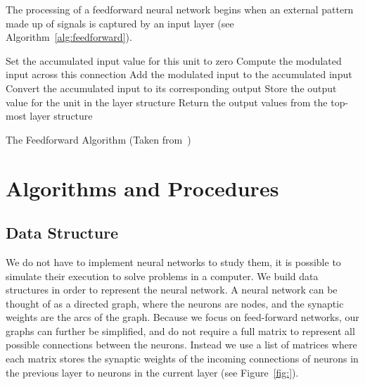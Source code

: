 \documentclass[11pt]{article}
\begin{document}
The processing of a feedforward neural network begins when an external pattern made up of signals is captured by an input layer (see
Algorithm~\ref{alg:feedforward}).

\begin{algorithm}%
\SetLine
{}
{
	{
		Set the accumulated input value for this unit to zero\;
			{
				Compute the modulated input across this connection\;
				Add the modulated input to the accumulated input\;
			}
		Convert the accumulated input to its corresponding output\;
		Store the output value for the unit in the layer structure\;
	}
	Return the output values from the top-most layer structure\;
}

\caption{The Feedforward Algorithm (Taken from~\cite{skapura})}
\label{alg:feedforward}
\end{algorithm}




\section{Algorithms and Procedures} %
\label{sec:algorithms_and_procedures}

\subsection{Data Structure} %
\label{sub:data_structure}

We do not have to implement neural networks to study them, it is possible to simulate their execution to solve problems in a computer.
We build data structures in order to represent the neural network. A neural network can be thought of as a directed graph, where the
neurons are nodes, and the synaptic weights are the arcs of the graph. Because we focus on feed-forward networks, our graphs can further
be simplified, and do not require a full matrix to represent all possible connections between the neurons. Instead we use a list of
matrices where each matrix stores the synaptic weights of the incoming connections of neurons in the previous layer to neurons in the current layer (see Figure~\ref{fig:}).
\end{document}
